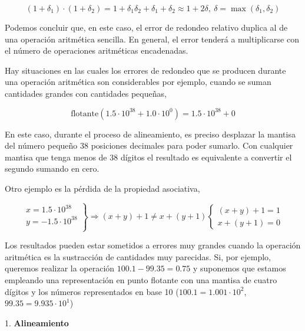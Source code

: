 \begin{equation*}
(1+\delta_1)\cdot(1+\delta_2)=1+\delta_1\delta_2+\delta_1+\delta_2\approx 1+2\delta,\ \delta=\max(\delta_1,\delta_2)
\end{equation*}

\begin{paracol}{2}
Podemos concluir que, en este caso, el error de redondeo relativo duplica al de una operación aritmética sencilla. En general, el error tenderá a multiplicarse con el número de operaciones aritméticas encadenadas.

Hay situaciones en las cuales los errores de redondeo que se producen durante una operación aritmética son considerables por ejemplo, cuando se suman cantidades grandes con cantidades pequeñas,
\end{paracol}
\begin{equation*}
\text{flotante}(1.5\cdot10^{38}+1.0\cdot10^0)=1.5\cdot10^{38} + 0
\end{equation*}
\begin{paracol}{2}
En este caso, durante el proceso de alineamiento, es preciso desplazar la mantisa del número pequeño 38 posiciones decimales para poder sumarlo. Con cualquier mantisa que tenga menos de 38 dígitos el resultado es equivalente a convertir el segundo sumando en cero.

Otro ejemplo es la pérdida de la propiedad asociativa,
\end{paracol}
\begin{equation*}
\left. \begin{aligned}
x=1.5\cdot10^{38}\\
y=-1.5\cdot10^{38}\\
\end{aligned}
\right\}
\Rightarrow
(x+y)+1\neq x+(y+1)
\begin{cases}
(x+y)+1=1\\
x+(y+1)=0
\end{cases}
\end{equation*}
\begin{paracol}{2}
Los resultados pueden estar sometidos a errores muy grandes cuando la operación aritmética es la sustracción de cantidades muy parecidas. Si, por ejemplo, queremos realizar la operación $100.1-99.35=0.75$ y suponemos que estamos empleando una representación en punto flotante con una mantisa de cuatro dígitos y los números representados en base 10 ($100.1=1.001\cdot10^2$, $99.35=9.935\cdot 10^1$) 

 1. \textbf{Alineamiento}
 \end{paracol}
 
